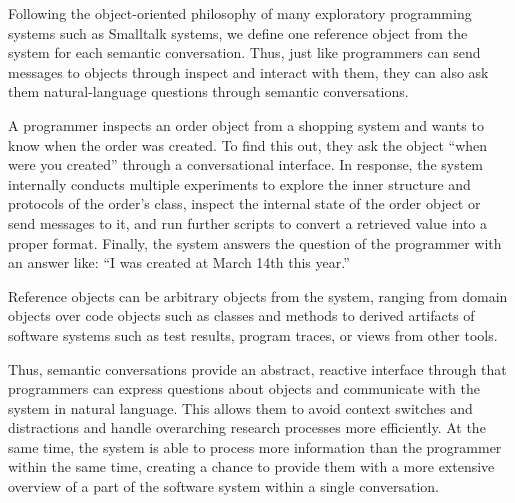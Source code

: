 Following the object-oriented philosophy of many exploratory programming systems such as Smalltalk systems, we define one reference object from the system for each semantic conversation.
Thus, just like programmers can send messages to objects through inspect and interact with them, they can also ask them natural-language questions through semantic conversations.

\begin{example}
	A programmer inspects an order object from a shopping system and wants to know when the order was created.
	To find this out, they ask the object ``when were you created'' through a conversational interface.
	In response, the system internally conducts multiple experiments to explore the inner structure and protocols of the order's class, inspect the internal state of the order object or send messages to it, and run further scripts to convert a retrieved value into a proper format.
	Finally, the system answers the question of the programmer with an answer like: ``I was created at March 14th this year.''
\end{example}

Reference objects can be arbitrary objects from the system, ranging from domain objects over code objects such as classes and methods to derived artifacts of software systems such as test results, program traces, or views from other tools.

Thus, semantic conversations provide an abstract, reactive interface through that programmers can express questions about objects and communicate with the system in natural language.
This allows them to avoid context switches and distractions and handle overarching research processes more efficiently.
At the same time, the system is able to process more information than the programmer within the same time, creating a chance to provide them with a more extensive overview of a part of the software system within a single conversation.
